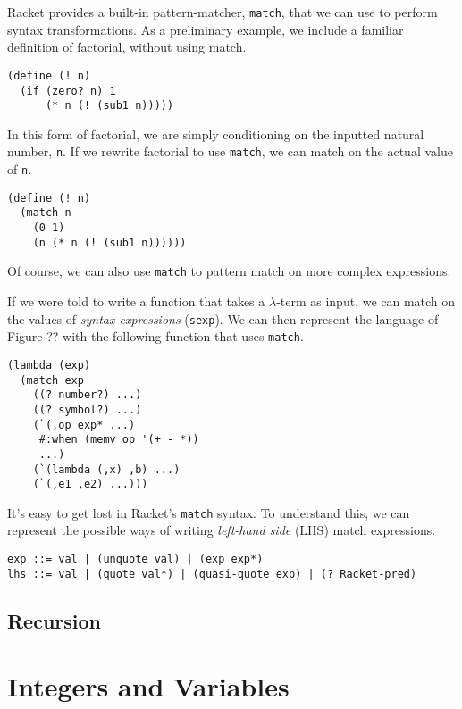 \documentclass[12pt]{book}
\begin{document}
Racket provides a built-in pattern-matcher, {\tt match}, that we can use to
perform syntax transformations. As a preliminary example, we include a
familiar definition of factorial, without using match.
\begin{verbatim}
(define (! n)
  (if (zero? n) 1
      (* n (! (sub1 n)))))
\end{verbatim}
In this form of factorial, we are simply conditioning on the inputted
natural number, {\tt n}. If we rewrite factorial to use {\tt match}, we can
match on the actual value of {\tt n}.
\begin{verbatim}
(define (! n)
  (match n
    (0 1)
    (n (* n (! (sub1 n))))))
\end{verbatim}
Of course, we can also use {\tt match} to pattern match on more complex
expressions.

If we were told to write a function that takes a \(\lambda\)-term as input,
we can match on the values of \textit{syntax-expressions} ({\tt sexp}). We
can then represent the language of Figure ?? with the following function
that uses {\tt match}.
\begin{verbatim}
(lambda (exp)
  (match exp
    ((? number?) ...)
    ((? symbol?) ...)
    (`(,op exp* ...)
     #:when (memv op '(+ - *))
     ...)
    (`(lambda (,x) ,b) ...)
    (`(,e1 ,e2) ...)))
\end{verbatim}
It's easy to get lost in Racket's {\tt match} syntax. To understand this,
we can represent the possible ways of writing \textit{left-hand side} (LHS)
match expressions.
\begin{verbatim}
exp ::= val | (unquote val) | (exp exp*)
lhs ::= val | (quote val*) | (quasi-quote exp) | (? Racket-pred) 
\end{verbatim}

\section{Recursion}

\chapter{Integers and Variables}
\label{ch:int-exp}
\end{document}
